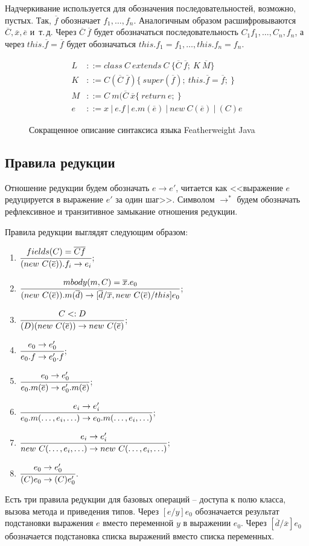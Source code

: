 Надчеркивание используется для обозначения последовательностей, возможно, пустых.
Так, $\overline{f}$ обозначает $f_1, \ldots, f_n$.
Аналогичным образом расшифровываются $\overline{C}, \overline{x}, \overline{e}$ и~т.\,д.
Через $\overline{C}\ \overline{f}$ будет обозначаться последовательность $C_1 f_1, \ldots, C_n, f_n$,
а через $this.\overline{f} = \overline{f}$ будет обозначаться $this.f_1 = f_1, \ldots, this.f_n = f_n$.
\begin{figure}
    \begin{align*}
        L &::= class\ C\ extends\ C\ \{\overline{C}\ \overline{f};\ K\ \overline{M}\}\\
        K &::= C(\overline{C}\ \overline{f})\{\ super(\overline{f});\ this.\overline{f} = \overline{f};\ \}\\
        M &::= C\ m(\overline{C}\ \overline{x}\{\ return\ e;\ \}\\
        e &::= x\ |\ e.f\ |\ e.m(\overline{e})\ |\ new\ C(\overline{e})\ |\ (C)e
    \end{align*}
    \caption{Сокращенное описание синтаксиса языка Featherweight Java}
    \label{fj-syntax}
\end{figure}
\subsection{Правила редукции}
Отношение редукции будем обозначать $e \rightarrow e'$, читается как <<выражение $e$ редуцируется в выражение $e'$ за один шаг>>.
Символом $\rightarrow^*$ будем обозначать рефлексивное и транзитивное замыкание отношения редукции.

Правила редукции выглядят следующим образом:
\begin{enumerate}
    \item $\cfrac{fields(C) = \overline{C}\overline{f}}{(new\ C(\overline{e})).f_i \rightarrow e_i}$;
    \item $\cfrac{mbody(m, C) = \overline{x}.e_0}{(new\ C(\overline{e})).m(\overline{d}) \rightarrow [\overline{d}/\overline{x}, new\ C(\overline{e})/this]e_0}$;
    \item $\cfrac{C <: D}{(D)(new\ C(\overline{e})) \rightarrow new\ C(\overline{e})}$;
    \item $\cfrac{e_0 \rightarrow e_0'}{e_0.f \rightarrow e_0'.f}$;
    \item $\cfrac{e_0 \rightarrow e_0'}{e_0.m(\overline{e}) \rightarrow e_0'.m(\overline{e})}$;
    \item $\cfrac{e_i \rightarrow e_i'}{e_0.m(\ldots, e_i, \ldots) \rightarrow e_0.m(\ldots, e_i, \ldots)}$;
    \item $\cfrac{e_i \rightarrow e_i'}{new\ C(\ldots, e_i, \ldots) \rightarrow new\ C(\ldots, e_i, \ldots)}$;
    \item $\cfrac{e_0 \rightarrow e_0'}{(C)e_0 \rightarrow (C)e_0'}$.
\end{enumerate}
Есть три правила редукции для базовых операций -- доступа к полю класса, вызова метода и приведения типов.
Через $[e/y]e_0$ обозначается результат подстановки выражения $e$ вместо переменной $y$ в выражении $e_0$.
Через $[\overline{d}/\overline{x}]e_0$ обозначается подстановка списка выражений вместо списка переменных.
